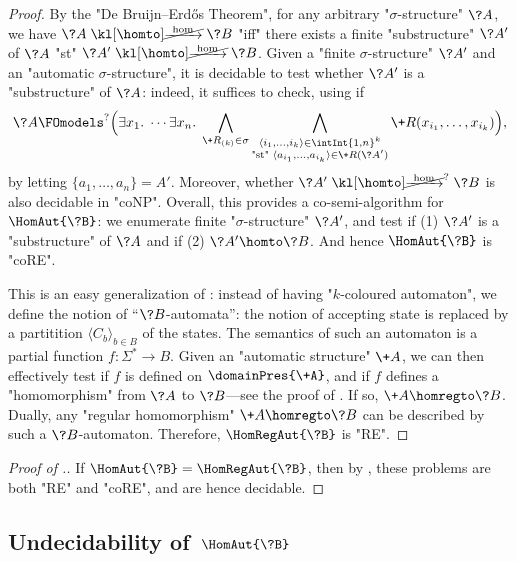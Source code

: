 \begin{proof}
	By the "De Bruijn–Erdős Theorem", for any arbitrary "$\sigma$-structure" $\?A$,
	we have $\?A \nothomto \?B$ "iff" there exists a finite "substructure" $\?A'$ of $\?A$
	"st" $\?A' \nothomto \?B$.
	Given a "finite $\sigma$-structure" $\?A'$ and an "automatic $\sigma$-structure",
	it is decidable to test whether $\?A'$ is a "substructure" of $\?A$: indeed, it suffices
	to check, using  if
	\[
		\?A
		\FOmodels^{?}
		\Bigl(
			\exists x_1.\; \cdots \exists x_n.\;
			\bigwedge_{\+R_{(k)} \in \sigma} \bigwedge_{\substack{\tup{i_1,\dotsc,i_k} \in \intInt{1,n}^k\\\text{"st" }\tup{a_{i_1},\dotsc,a_{i_k}} \in \+R(\?A')}}
			\+R(x_{i_1},\dotsc,x_{i_k})
		\Bigr),
	\]
	by letting $\{a_1,\dotsc,a_n\} = A'$. 
	Moreover, whether $\?A' \nothomto^? \?B$ is also decidable in "coNP".
	Overall, this provides a co-semi-algorithm for $\HomAut{\?B}$: we enumerate finite
	"$\sigma$-structure" $\?A'$, and test if (1) $\?A'$ is a "substructure" of $\?A$ and if (2)
	$\?A' \homto \?B$. And hence $\HomAut{\?B}$ is "coRE".

	 This is an easy generalization of
	: instead of having "$k$-coloured automaton", we define the notion of
	``$\?B$-automata'': the notion of accepting state is replaced by a partitition $\langle C_{b} \rangle_{b \in B}$ of the states.
	The semantics of such an automaton is a partial function $f\colon \Sigma^* \to B$. 
	Given an "automatic structure" $\+A$, we can then effectively test if $f$ is defined on $\domainPres{\+A}$, and if $f$ defines a "homomorphism" from $\?A$ to $\?B$---see
	the proof of . If so, $\+A \homregto \?B$. Dually, any "regular homomorphism" $\+A \homregto \?B$ can be described by such a $\?B$-automaton.
	Therefore, $\HomRegAut{\?B}$ is "RE".
\end{proof}

\begin{proof}[Proof of .]
	If $\HomAut{\?B} = \HomRegAut{\?B}$, then by ,
	these problems are both "RE" and "coRE", and are hence decidable.
\end{proof}

\subsection{Undecidability of \,$\HomAut{\?B}$}
\label{sec:undecidability-hom}

